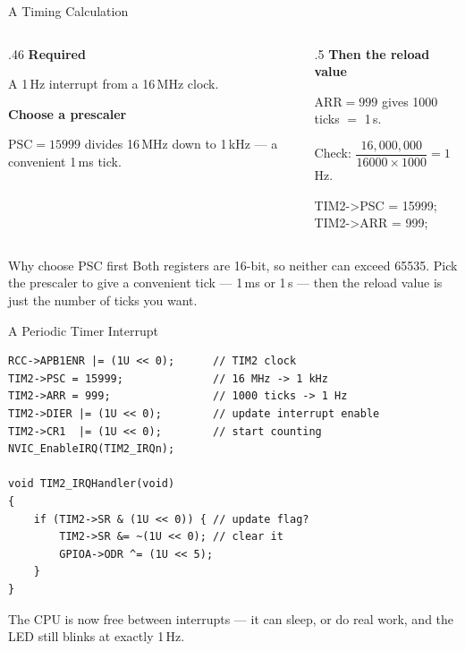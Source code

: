 \documentclass[9pt,aspectratio=169,xcolor=table]{beamer}
\begin{document}
\begin{frame}{A Timing Calculation}
    \begin{columns}[T]
    \begin{column}{.46\textwidth}
        \textbf{Required}

        \vspace{1mm}
        {\small A 1\,Hz interrupt from a 16\,MHz clock.}

        \vspace{3mm}
        \textbf{Choose a prescaler}

        \vspace{1mm}
        {\small $\text{PSC} = 15999$ divides 16\,MHz down to
        \alert{1\,kHz} --- a convenient 1\,ms tick.}
    \end{column}
    \begin{column}{.5\textwidth}
        \textbf{Then the reload value}

        \vspace{1mm}
        {\small $\text{ARR} = 999$ gives 1000 ticks $=$ \alert{1\,s}.}

        \vspace{3mm}
        {\small Check:
        $\dfrac{16{,}000{,}000}{16000 \times 1000} = 1$\,Hz.}

        \vspace{3mm}
        {\ttfamily\scriptsize
        TIM2->PSC = 15999; \\
        TIM2->ARR = 999;}
    \end{column}
    \end{columns}

    \vspace{3mm}
    \begin{block}{Why choose PSC first}
        Both registers are 16-bit, so neither can exceed 65535. Pick the
        prescaler to give a \alert{convenient tick} --- 1\,ms or 1\,\textmu s ---
        then the reload value is just the number of ticks you want.
    \end{block}
\end{frame}

\begin{frame}[fragile]{A Periodic Timer Interrupt}
\begin{lstlisting}[style=myc, basicstyle=\ttfamily\small]
RCC->APB1ENR |= (1U << 0);      // TIM2 clock
TIM2->PSC = 15999;              // 16 MHz -> 1 kHz
TIM2->ARR = 999;                // 1000 ticks -> 1 Hz
TIM2->DIER |= (1U << 0);        // update interrupt enable
TIM2->CR1  |= (1U << 0);        // start counting
NVIC_EnableIRQ(TIM2_IRQn);

void TIM2_IRQHandler(void)
{
    if (TIM2->SR & (1U << 0)) { // update flag?
        TIM2->SR &= ~(1U << 0); // clear it
        GPIOA->ODR ^= (1U << 5);
    }
}
\end{lstlisting}

    \vspace{2mm}
    {\small The CPU is now \alert{free} between interrupts --- it can sleep, or do
    real work, and the LED still blinks at exactly 1\,Hz.}
\end{frame}
\end{document}
